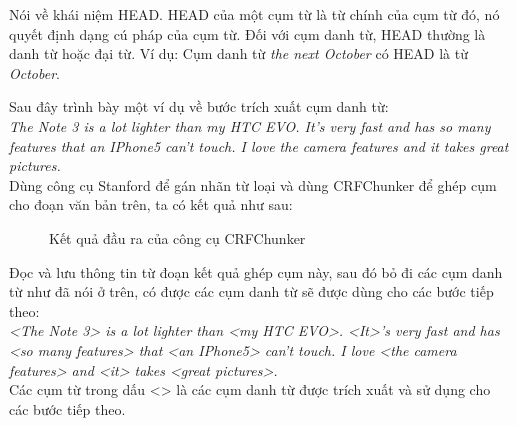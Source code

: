 \documentclass[12pt]{report}
\begin{document}
				\par Nói về khái niệm HEAD. HEAD của một cụm từ là từ chính của cụm từ đó, nó quyết định dạng cú pháp của cụm từ. Đối với cụm danh từ, HEAD thường là danh từ hoặc đại từ. Ví dụ: Cụm danh từ \textit{the next October} có HEAD là từ \textit{October}.
				\par Sau đây trình bày một ví dụ về bước trích xuất cụm danh từ:
					\\\textit{The Note 3 is a lot lighter than my HTC EVO. It's very fast and has so many features that an IPhone5 can't touch. I love the camera features and it takes great pictures.}
					\\Dùng công cụ Stanford để gán nhãn từ loại và dùng CRFChunker để ghép cụm cho đoạn văn bản trên, ta có kết quả như sau:

					\begin{figure}[H]
						\centering				
						\noindent{}
						\caption{Kết quả đầu ra của công cụ CRFChunker}
					\end{figure}

					\par Đọc và lưu thông tin từ đoạn kết quả ghép cụm này, sau đó bỏ đi các cụm danh từ như đã nói ở trên, có được các cụm danh từ sẽ được dùng cho các bước tiếp theo:\\
					\textit{<The Note 3> is a lot lighter than <my HTC EVO>. <It>'s very fast and has <so many features> that <an IPhone5> can't touch. I love <the camera features> and <it> takes <great pictures>.}
					\\Các cụm từ trong dấu <> là các cụm danh từ được trích xuất và sử dụng cho các bước tiếp theo.
\end{document}
